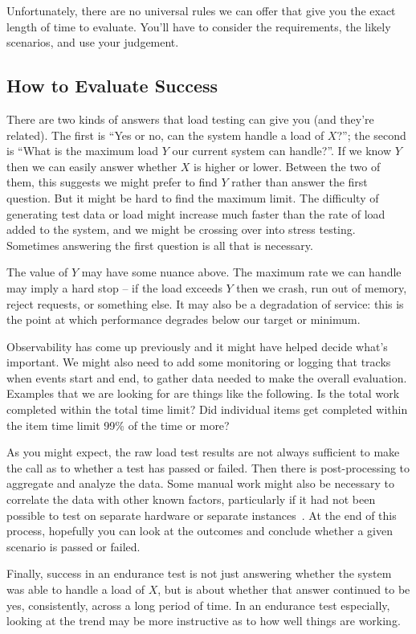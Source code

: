 Unfortunately, there are no universal rules we can offer that give you the exact length of time to evaluate. You'll have to consider the requirements, the likely scenarios, and use your judgement.

\subsection*{How to Evaluate Success}
There are two kinds of answers that load testing can give you (and they're related). The first is ``Yes or no, can the system handle a load of $X$?''; the second is ``What is the maximum load $Y$ our current system can handle?''. If we know $Y$ then we can easily answer whether $X$ is higher or lower. Between the two of them, this suggests we might prefer to find $Y$ rather than answer the first question. But it might be hard to find the maximum limit. The difficulty of generating test data or load might increase much faster than the rate of load added to the system, and we might be crossing over into stress testing. Sometimes answering the first question is all that is necessary.

The value of $Y$ may have some nuance above. The maximum rate we can handle may imply a hard stop -- if the load exceeds $Y$ then we crash, run out of memory, reject requests, or something else. It may also be a degradation of service: this is the point at which performance degrades below our target or minimum. 

Observability has come up previously and it might have helped decide what's important. We might also need to add some monitoring or logging that tracks when events start and end, to gather data needed to make the overall evaluation. Examples that we are looking for are things like the following. Is the total work completed within the total time limit? Did individual items get completed within the item time limit 99\% of the time or more? 

As you might expect, the raw load test results are not always sufficient to make the call as to whether a test has passed or failed. Then there is post-processing to aggregate and analyze the data. Some manual work might also be necessary to correlate the data with other known factors, particularly if it had not been possible to test on separate hardware or separate instances~\cite{hitchhiking}. At the end of this process, hopefully you can look at the outcomes and conclude whether a given scenario is passed or failed.

Finally, success in an endurance test is not just answering whether the system was able to handle a load of $X$, but is about whether that answer continued to be yes, consistently, across a long period of time. In an endurance test especially, looking at the trend may be more instructive as to how well things are working.


